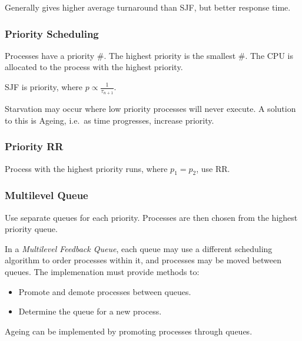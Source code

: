 Generally gives higher average turnaround than SJF, but better response time.


\subsubsection{Priority Scheduling}

Processes have a priority \#. The highest priority is the smallest \#. The CPU is allocated
to the process with the highest priority.

SJF is priority, where $p\propto\frac{1}{\tau_{n+1}}$.

Starvation may occur where low priority processes will never execute. A solution to this
is Ageing, i.e.\ as time progresses, increase priority.


\subsubsection{Priority RR}

Process with the highest priority runs, where $p_1=p_2$, use RR.


\subsubsection{Multilevel Queue}

Use separate queues for each priority. Processes are then chosen from the highest
priority queue.

In a \textit{Multilevel Feedback Queue}, each queue may use a different scheduling algorithm to
order processes within it, and processes may be moved between queues. The implemenation must provide
methods to:
\begin{itemize}
    \item Promote and demote processes between queues.
    \item Determine the queue for a new process.
\end{itemize}

Ageing can be implemented by promoting processes through queues.